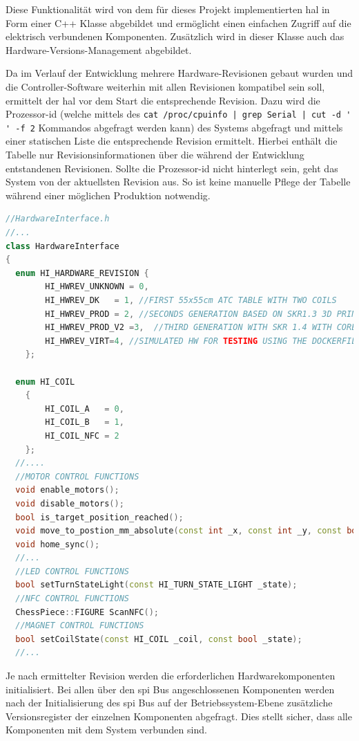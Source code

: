 Diese Funktionalität wird von dem für dieses Projekt implementierten
\gls{hal} in Form einer C++ Klasse abgebildet und ermöglicht einen
einfachen Zugriff auf die elektrisch verbundenen Komponenten. Zusätzlich
wird in dieser Klasse auch das Hardware-Versions-Management abgebildet.

Da im Verlauf der Entwicklung mehrere Hardware-Revisionen gebaut wurden
und die Controller-Software weiterhin mit allen Revisionen kompatibel
sein soll, ermittelt der \gls{hal} vor dem Start die entsprechende
Revision. Dazu wird die Prozessor-\gls{id} (welche mittels des
\passthrough{\lstinline!cat /proc/cpuinfo | grep Serial | cut -d ' ' -f 2!}
Kommandos abgefragt werden kann) des Systems abgefragt und mittels einer
statischen Liste die entsprechende Revision ermittelt. Hierbei enthält
die Tabelle nur Revisionsinformationen über die während der Entwicklung
entstandenen Revisionen. Sollte die Prozessor-\gls{id} nicht hinterlegt
sein, geht das System von der aktuellsten Revision aus. So ist keine
manuelle Pflege der Tabelle während einer möglichen Produktion
notwendig.

\begin{lstlisting}[language={C++}]
//HardwareInterface.h
//...
class HardwareInterface
{
  enum HI_HARDWARE_REVISION {
        HI_HWREV_UNKNOWN = 0,
        HI_HWREV_DK   = 1, //FIRST 55x55cm ATC TABLE WITH TWO COILS
        HI_HWREV_PROD = 2, //SECONDS GENERATION BASED ON SKR1.3 3D PRINT CONTROLLER
        HI_HWREV_PROD_V2 =3,  //THIRD GENERATION WITH SKR 1.4 WITH CORE XY MECHANIC
        HI_HWREV_VIRT=4, //SIMULATED HW FOR TESTING USING THE DOCKERFILE
    };

  enum HI_COIL
    {
        HI_COIL_A   = 0,
        HI_COIL_B   = 1,
        HI_COIL_NFC = 2
    };
  //....
  //MOTOR CONTROL FUNCTIONS
  void enable_motors();
  void disable_motors();
  bool is_target_position_reached();
  void move_to_postion_mm_absolute(const int _x, const int _y, const bool _blocking);
  void home_sync();
  //...
  //LED CONTROL FUNCTIONS
  bool setTurnStateLight(const HI_TURN_STATE_LIGHT _state);
  //NFC CONTROL FUNCTIONS
  ChessPiece::FIGURE ScanNFC();
  //MAGNET CONTROL FUNCTIONS
  bool setCoilState(const HI_COIL _coil, const bool _state);
  //...
\end{lstlisting}

Je nach ermittelter Revision werden die erforderlichen
Hardwarekomponenten initialisiert. Bei allen über den \gls{spi} Bus
angeschlossenen Komponenten werden nach der Initialisierung des
\gls{spi} Bus auf der Betriebssystem-Ebene zusätzliche Versionsregister
der einzelnen Komponenten abgefragt. Dies stellt sicher, dass alle
Komponenten mit dem System verbunden sind.

